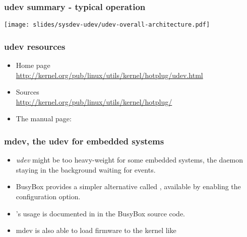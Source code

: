 \begin{frame}
  \frametitle{udev summary - typical operation}
  \begin{center}
    \texttt{[image: slides/sysdev-udev/udev-overall-architecture.pdf]}
  \end{center}
\end{frame}

\begin{frame}
  \frametitle{udev resources}
  \begin{itemize}
  \item Home page\\
    \url{http://kernel.org/pub/linux/utils/kernel/hotplug/udev.html}
  \item Sources\\
    \url{http://kernel.org/pub/linux/utils/kernel/hotplug/}
  \item The  manual page:\\
  \end{itemize}
\end{frame}

\begin{frame}
  \frametitle{mdev, the udev for embedded systems}
  \begin{itemize}
  \item {\em udev} might be too heavy-weight for some embedded
    systems, the  daemon staying in the background waiting for
    events.
  \item BusyBox provides a simpler alternative called ,
    available by enabling the  configuration option.
  \item {}'s usage is documented in  in the BusyBox source code.
  \item{}mdev is also able to load firmware to the kernel like
  \end{itemize}
\end{frame}

